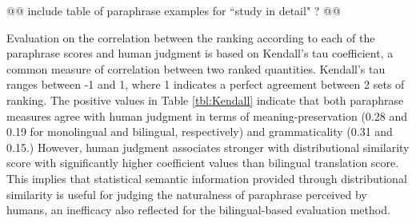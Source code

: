 \documentclass[11pt]{article}
\begin{document}
@@ include table of paraphrase examples for ``study in detail" ? @@



Evaluation on the correlation between the ranking according to each of the paraphrase scores and human judgment is based on Kendall's tau coefficient, a common measure of correlation between two ranked quantities. Kendall's tau ranges between -1 and 1, where 1 indicates a perfect agreement between 2 sets of ranking. The positive values in Table \ref{tbl:Kendall} indicate that both paraphrase measures agree with human judgment in terms of meaning-preservation (0.28 and 0.19 for monolingual and bilingual, respectively) and grammaticality (0.31 and 0.15.) However, human judgment associates stronger with distributional similarity score with significantly higher coefficient values than bilingual translation score. This implies that statistical semantic information provided through distributional similarity is useful for judging the naturalness of paraphrase perceived by humans, an inefficacy also reflected for the bilingual-based evaluation method.
 
\end{document}

